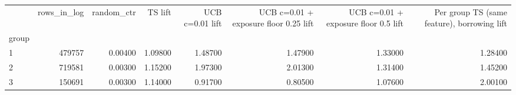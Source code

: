 \begin{tabular}{lrrrrrrr}
\toprule
 & rows\_in\_log & random\_ctr & TS lift & UCB c=0.01 lift & UCB c=0.01 + exposure floor 0.25 lift & UCB c=0.01 + exposure floor 0.5 lift & Per group TS (same feature), borrowing lift \\
group &  &  &  &  &  &  &  \\
\midrule
1 & 479757 & 0.00400 & 1.09800 & 1.48700 & 1.47900 & 1.33000 & 1.28400 \\
2 & 719581 & 0.00300 & 1.15200 & 1.97300 & 2.01300 & 1.31400 & 1.45200 \\
3 & 150691 & 0.00300 & 1.14000 & 0.91700 & 0.80500 & 1.07600 & 2.00100 \\
\bottomrule
\end{tabular}
